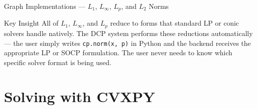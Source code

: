 \documentclass[aspectratio=169,10pt]{beamer}
\begin{document}
\begin{frame}[allowframebreaks]{Graph Implementations --- $L_1$, $L_\infty$, $L_p$, and $L_2$ Norms}
  \begin{alertblock}{Key Insight}
    All of $L_1$, $L_\infty$, and $L_p$ reduce to forms that standard
    LP or conic solvers handle natively.  The DCP system performs
    these reductions automatically --- the user simply writes
    \texttt{cp.norm(x, p)} in Python and the backend receives the
    appropriate LP or SOCP formulation.  The user never needs to
    know which specific solver format is being used.
  \end{alertblock}

\end{frame}

\section{Solving with CVXPY}
\end{document}
